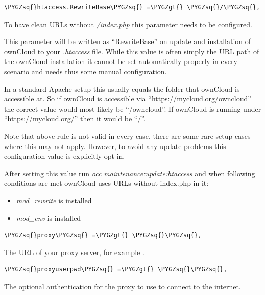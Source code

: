 \documentclass[letterpaper,10pt,english]{sphinxmanual}
\def\PYGZgt{\char`\>}
\def\PYGZsq{\char`\'}
\renewcommand\PYGZsq{\textquotesingle}
\begin{document}
\begin{Verbatim}[commandchars=\\\{\}]
\PYGZsq{}htaccess.RewriteBase\PYGZsq{} =\PYGZgt{} \PYGZsq{}/\PYGZsq{},
\end{Verbatim}

To have clean URLs without \emph{/index.php} this parameter needs to be configured.

This parameter will be written as ``RewriteBase'' on update and installation of
ownCloud to your \emph{.htaccess} file. While this value is often simply the URL
path of the ownCloud installation it cannot be set automatically properly in
every scenario and needs thus some manual configuration.

In a standard Apache setup this usually equals the folder that ownCloud is
accessible at. So if ownCloud is accessible via ``\href{https://mycloud.org/owncloud}{https://mycloud.org/owncloud}''
the correct value would most likely be ``/owncloud''. If ownCloud is running
under ``\href{https://mycloud.org/}{https://mycloud.org/}'' then it would be ``/''.

Note that above rule is not valid in every case, there are some rare setup
cases where this may not apply. However, to avoid any update problems this
configuration value is explicitly opt-in.

After setting this value run \emph{occ maintenance:update:htaccess} and when following
conditions are met ownCloud uses URLs without index.php in it:
\begin{itemize}
\item {} 
\emph{mod\_rewrite} is installed

\item {} 
\emph{mod\_env} is installed

\end{itemize}

\begin{Verbatim}[commandchars=\\\{\}]
\PYGZsq{}proxy\PYGZsq{} =\PYGZgt{} \PYGZsq{}\PYGZsq{},
\end{Verbatim}

The URL of your proxy server, for example .

\begin{Verbatim}[commandchars=\\\{\}]
\PYGZsq{}proxyuserpwd\PYGZsq{} =\PYGZgt{} \PYGZsq{}\PYGZsq{},
\end{Verbatim}

The optional authentication for the proxy to use to connect to the internet.
\end{document}
